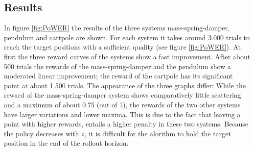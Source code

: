 \documentclass[letterpaper, 10 pt, conference]{ieeeconf}  %
\begin{document}

%

\subsection{Results}
In figure \ref{fig:PoWER} 
the results of the three systems mass-spring-damper, pendulum and cartpole are shown. For each system it takes around 3.000 trials to reach the target positions with a sufficient quality (see figure \ref{fig:PoWER}). At first the three reward curves of the systems show a fast improvement. After about 500 trials the rewards of the mass-spring-damper and the pendulum show a moderated linear improvement; the reward of the cartpole has its significant point at about 1.500 trials. The appearance of the three graphs differ: While the reward of the mass-spring-damper system shows comparatively little scattering and a maximum of about 0.75 (out of 1), the rewards of the two other systems have larger variations and lower maxima. This is due to the fact that leaving a point with higher rewards, entails a higher penalty in these two systems. Because the policy decreases with $z$, it is difficult for the alorithm to hold the target position in the end of the rollout horizon.
\end{document}
